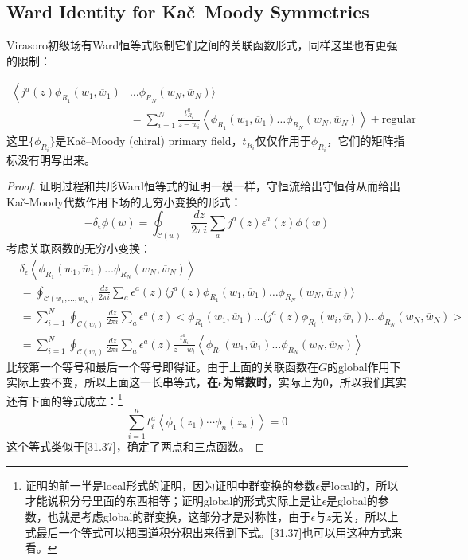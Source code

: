 \subsection{Ward Identity for Ka\v{c}\mbox{–}Moody Symmetries}
Virasoro初级场有Ward恒等式限制它们之间的关联函数形式，同样这里也有更强的限制：
\begin{theorem}
	\begin{equation}\label{38.11}
		\boxed{
			\begin{aligned}
				\left<j^{a}(z)\phi_{R_{1}}(w_{1},\overline{w}_{1})\right.& \ldots\phi_{R_N}(w_N,\overline{w}_N)\rangle   \\
				&=\sum_{i=1}^N\frac{t_{R_i}^a}{z-w_i}\left\langle\left.\phi_{R_1}(w_1,\overline{w}_1)\ldots\phi_{R_N}(w_N,\overline{w}_N)\right.\right\rangle +\text{regular}
			\end{aligned}
		}
	\end{equation}
	这里$\{\phi_{R_i}\}$是Ka\v{c}\mbox{–}Moody (chiral) primary field，$t_{R_i}$仅仅作用于$\phi_{R_i}$，它们的矩阵指标没有明写出来。
\end{theorem}
\begin{proof}
	证明过程和共形Ward恒等式的证明一模一样，守恒流给出守恒荷从而给出Ka\v{c}\mbox{-}Moody代数作用下场的无穷小变换的形式：
	\begin{equation}
		-\delta_\epsilon\phi(w)=\oint_{\mathcal{C}(w)}\frac{dz}{2\pi i}\sum_a\left.j^a(z)\right.\epsilon^a(z)\phi(w)
	\end{equation}
	考虑关联函数的无穷小变换：
	\begin{equation}
		\begin{aligned}
			&\delta_{\epsilon}\left\langle\phi_{R_{1}}(w_{1},\overline{w}_{1})\ldots\phi_{R_{N}}(w_{N},\overline{w}_{N})\right\rangle  \\
			&=\oint_{\mathcal{C}(w_1,...,w_N)}\frac{dz}{2\pi i}\sum_a\epsilon^a(z)\Big\langle j^a(z)\phi_{R_1}(w_1,\overline{w}_1)\ldots\phi_{R_N}(w_N,\overline{w}_N)\Big\rangle  \\
			&=\sum_{i=1}^N\oint_{\mathcal{C}(w_i)}\frac{dz}{2\pi i}\sum_a\epsilon^a(z)\big<\phi_{R_1}(w_1,\overline{w}_1)\ldots\bigg(j^a(z)\phi_{R_i}(w_i,\overline{w}_i)\bigg)\ldots\phi_{R_N}(w_N,\overline{w}_N)\big>\\
			&=\sum_{i=1}^N\oint_{\mathcal{C}(w_i)}\frac{dz}{2\pi i}\sum_a\epsilon^a(z)\frac{t_{R_i}^a}{z-w_i}\left\langle\phi_{R_1}(w_1,\overline{w}_1)\ldots\phi_{R_N}(w_N,\overline{w}_N)\right\rangle
		\end{aligned}
	\end{equation}
	比较第一个等号和最后一个等号即得证。由于上面的关联函数在$G$的global作用下实际上要不变，所以上面这一长串等式，\textbf{在$\epsilon$为常数时}，实际上为0，所以我们其实还有下面的等式成立：\footnote{证明的前一半是local形式的证明，因为证明中群变换的参数$\epsilon$是local的，所以才能说积分号里面的东西相等；证明global的形式实际上是让$\epsilon$是global的参数，也就是考虑global的群变换，这部分才是对称性，由于$\epsilon$与$z$无关，所以上式最后一个等式可以把围道积分积出来得到下式。\ref{31.37}也可以用这种方式来看。}
	\begin{equation}
		\boxed{
			\sum_{i=1}^nt_i^a\left<\phi_1(z_1)\cdots\phi_n(z_n)\right>=0
		}
	\end{equation}
	这个等式类似于\ref{31.37}，确定了两点和三点函数。
\end{proof}
